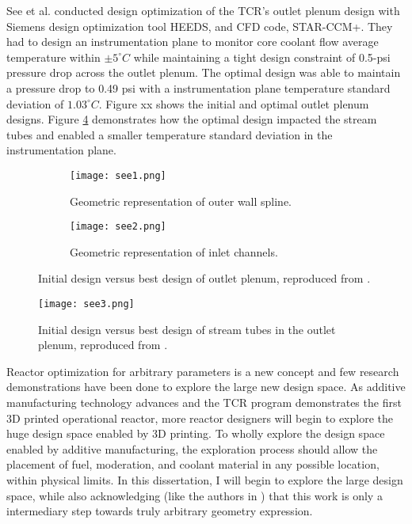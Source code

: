 See et al. \cite{see_design_2022} conducted design optimization of the 
\gls{TCR}'s outlet plenum design with Siemens design optimization tool HEEDS, 
and \gls{CFD} code, STAR-CCM+. 
They had to design an instrumentation plane to monitor core coolant flow average 
temperature within $\pm 5 ^{\circ}C$ while maintaining a tight design 
constraint of 0.5-psi pressure drop across the outlet plenum.
The optimal design was able to maintain a pressure drop 
to 0.49 psi with a instrumentation plane temperature standard deviation of 
$1.03^{\circ}C$. 
Figure xx shows the initial and optimal outlet plenum designs. 
Figure \ref{fig:see3} demonstrates how the optimal design impacted the stream 
tubes and enabled a smaller temperature standard deviation in the 
instrumentation plane. 
\begin{figure}[btp]
    \centering
    \begin{subfigure}{0.49\textwidth}
        \texttt{[image: see1.png]}
        \caption{Geometric representation of outer wall spline.}
        \label{fig:see1} 
    \end{subfigure}
    \begin{subfigure}{0.49\textwidth}
        \texttt{[image: see2.png]}
        \caption{Geometric representation of inlet channels.}
        \label{fig:see2} 
    \end{subfigure}
    \caption{Initial design versus best design of outlet plenum, reproduced 
    from \cite{see_design_2022}.}
\end{figure}
\begin{figure}[btp]
    \centering
    \texttt{[image: see3.png]} 
    \caption{Initial design versus best design of stream tubes in the outlet 
    plenum, reproduced from \cite{see_design_2022}.}
    \label{fig:see3}
\end{figure}

Reactor optimization for arbitrary parameters is a new concept and few research 
demonstrations have been done to explore the large new design space. 
As additive manufacturing technology advances and the \gls{TCR} program 
demonstrates the first 3D printed operational reactor, more reactor designers 
will begin to explore the huge design space enabled by 3D printing. 
To wholly explore the design space enabled by additive manufacturing, the 
exploration process should allow the placement of fuel, moderation, and coolant 
material in any possible location, within physical limits. 
In this dissertation, I will begin to explore the large design space, while 
also acknowledging (like the authors in \cite{sobes_artificial_2020}) that 
this work is only a intermediary step towards truly arbitrary geometry expression. 

